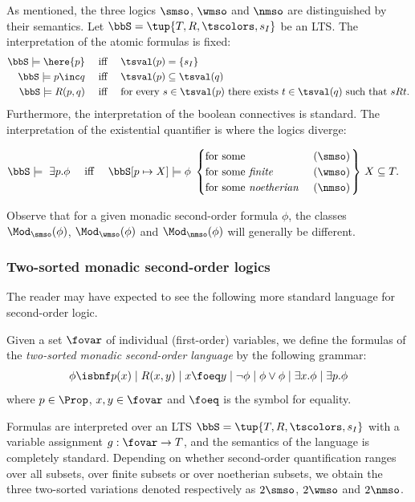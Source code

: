 As mentioned, the three logics $\smso$, $\wmso$ and $\nmso$ are distinguished by
their semantics. 
Let  $\bbS = \tup{T,R,\tscolors, s_I}$ be an LTS.
The interpretation of the atomic formulas is fixed:
\begin{align*}
    \bbS \models \here{p} & \quad\text{ iff }\quad  \tsval(p) = \{s_I\} 
\\ \bbS \models p \inc q & \quad\text{ iff }\quad  \tsval(p) \subseteq \tsval(q)
\\ \bbS \models R(p,q) & \quad\text{ iff }\quad  
  \text{for every $s\in \tsval(p)$ there exists $t\in \tsval(q)$ such that $sRt$.} 
\end{align*}
Furthermore, the interpretation of the boolean connectives is standard.
The interpretation of the existential quantifier is where the logics diverge:

\begin{align*}
\bbS \models\ \exists p. \phi  & \quad\text{ iff }\quad  \bbS[p \mapsto X] \models \phi \,
\left.\begin{cases}
   \text{for some }                   & (\smso)
\\ \text{for some \emph{finite} }     & (\wmso) 
\\ \text{for some \emph{noetherian} } & (\nmso)
\end{cases}\right\}\,
 X \subseteq T.
\end{align*}

Observe that for a given monadic second-order formula $\phi$, the classes 
$\Mod_{\smso}(\phi)$, $\Mod_{\wmso}(\phi)$ and $\Mod_{\nmso}(\phi)$ will 
generally be different.

\subsubsection*{Two-sorted monadic second-order logics}
The reader may have expected to see the following more standard language for
second-order logic.
\begin{definition}
\label{def:2mso}
Given a set $\fovar$ of individual (first-order) variables, we define the 
formulas of the \emph{two-sorted monadic second-order language} by the following
grammar:
\[
\phi \isbnf  p(x)
\mid R(x,y)
\mid x \foeq y
\mid \neg \phi
\mid \phi \lor \phi
\mid \exists x.\phi
\mid \exists p.\phi
\]
where $p \in \Prop$, $x,y \in \fovar$ and $\foeq$ is the symbol for equality.   
\end{definition}

Formulas are interpreted over an LTS $\bbS = \tup{T,R,\tscolors, s_I}$ with a
variable assignment $g: \fovar \to T$, and the semantics of the language is
completely standard. 
Depending on whether second-order quantification ranges over all subsets, over 
finite subsets or over noetherian subsets, we obtain the three two-sorted 
variations denoted respectively as $2\smso$, $2\wmso$ and $2\nmso$.

